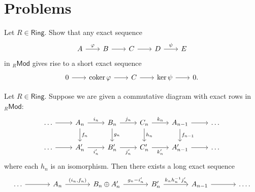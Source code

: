 \section*{Problems}

\begin{problem}
	\label{prob:2.17}
	Let $R \in \mathsf{Ring}$. Show that any exact sequence
	\begin{equation*}
		\begin{tikzcd}[column sep = 2em]
			A \arrow[r,"\varphi"] & B \arrow[r] & C \arrow[r] & D \arrow[r,"\psi"] & E
		\end{tikzcd}
	\end{equation*}
	\noindent in $_{R}\mathsf{Mod}$ gives rise to a short exact sequence
	\begin{equation*}
		\begin{tikzcd}[column sep = 2em]
			0 \arrow[r] & \coker \varphi \arrow[r] & C \arrow[r] & \ker \psi \arrow[r] & 0.
		\end{tikzcd}
	\end{equation*}
\end{problem}

\begin{problem}
	Let $R \in \mathsf{Ring}$. Suppose we are given a commutative diagram with exact rows in $_R\mathsf{Mod}$:
	\begin{equation*}
		\begin{tikzcd}
			\dots \arrow[r] & A_n \arrow[r,"i_n"]\arrow[d,"f_n"] & B_n \arrow[r,"j_n"]\arrow[d,"g_n"] & C_n \arrow[r,"k_n"]\arrow[d,"h_n"] & A_{n - 1} \arrow[r]\arrow[d,"f_{n - 1}"] & \dots\\
			\dots \arrow[r] & A'_n \arrow[r,"i'_n"'] & B'_n \arrow[r,"j'_n"'] & C'_n \arrow[r,"k'_n"'] & A'_{n - 1} \arrow[r] & \dots
		\end{tikzcd} 
	\end{equation*}
	\noindent where each $h_n$ is an isomorphism. Then there exists a long exact sequence
	\begin{equation*}
		\begin{tikzcd}[column sep=3.5em]
			\dots \arrow[r] & A_n \arrow[r,"{(i_n,f_n)}"] & B_n \oplus A_n' \arrow[r,"g_n - i_n'"] & B_n' \arrow[r,"k_nh_n^{-1}j_n'"] & A_{n - 1} \arrow[r] & \dots.
		\end{tikzcd}
	\end{equation*}	
\end{problem}
